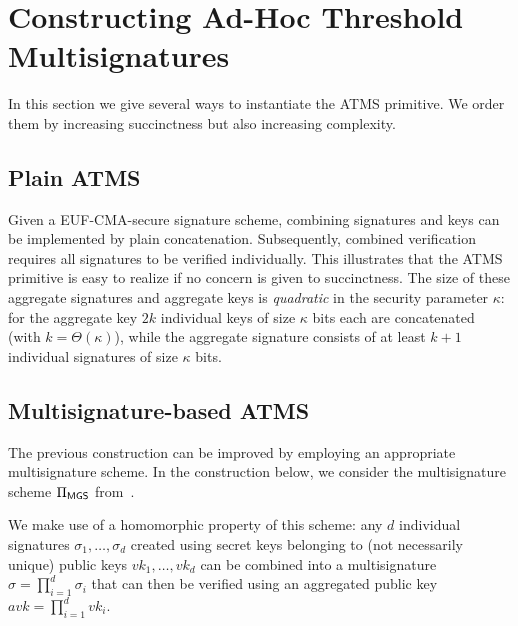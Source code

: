 \section{Constructing Ad-Hoc Threshold Multisignatures}
\label{sec:auth}


In this section we give several ways to instantiate the ATMS primitive.  We order
them by increasing succinctness but also increasing complexity.

\subsection{Plain ATMS}

Given a EUF-CMA-secure signature scheme, combining signatures and keys can be
implemented  by plain concatenation. Subsequently, combined verification
requires all signatures to be verified individually. This illustrates that the
ATMS primitive is easy to realize if no concern is given to succinctness.
%
The size of these aggregate signatures and aggregate keys is \emph{quadratic} in
the security parameter $\kappa$: for the aggregate key $2k$ individual keys of size
$\kappa$ bits each are concatenated (with $k=\Theta(\kappa)$), while the aggregate signature consists of
at least $k+1$ individual signatures of size $\kappa$ bits.

\subsection{Multisignature-based ATMS}

The previous construction can be improved by
employing an appropriate multisignature
scheme.
In the construction below, we consider the multisignature scheme
$\Pi_{\textsf{MGS}}$
from~\cite{boldyreva2003threshold}.

We make use of a homomorphic property of
this scheme:
any $d$ individual signatures $\sigma_1,\ldots,\sigma_d$ created using
secret keys belonging to (not necessarily unique) public keys $vk_1,\ldots,vk_d$
can be combined into a multisignature $\sigma=\prod_{i=1}^{d}\sigma_i$ that can
then be verified using an aggregated public key $avk=\prod_{i=1}^{d}vk_i$.


